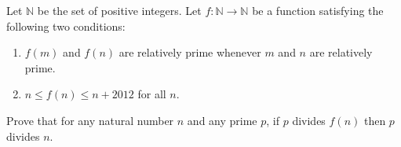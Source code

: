 Let $\mathbb N$ be the set of positive integers.  Let $f: \mathbb N \to \mathbb N$ be a function satisfying the following two conditions: 
\begin{enumerate}[label=(\alph*)]
	\item $f(m)$ and $f(n)$ are relatively prime whenever $m$ and $n$ are relatively prime.
	\item $n \le f(n) \le n+2012$ for all $n$.
\end{enumerate}
Prove that for any natural number $n$ and any prime $p$, if $p$ divides $f(n)$ then $p$ divides $n$.
